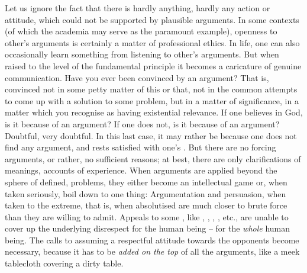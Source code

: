 Let us ignore the fact that there is hardly anything, hardly any action or
attitude, which could not be supported by plausible arguments.  In some contexts
(of which the academia may serve as the paramount example), openness to other's
arguments is certainly a matter of professional ethics.  In life, one can also
occasionally learn something from listening to other's arguments.  But when
raised to the level of the fundamental principle it becomes a caricature of
genuine communication.  Have you ever been convinced by an argument?  That is,
convinced not in some petty matter of this or that, not in the common attempts
to come up with a solution to some problem, but in a matter of significance, in
a matter which you recognise as having existential relevance.  If one believes
in God, is it because of an argument?  If one does not, is it because of an
argument? Doubtful, very doubtful. In this last case, it may rather be because
one does not find any argument, and rests satisfied with one's
.  But there are no forcing arguments, or rather, no sufficient
reasons; at best, there are only clarifications of meanings, accounts of
experience.  When arguments are applied beyond the sphere of 
defined,  problems, they either become an intellectual game or, when
taken seriously, boil down to one thing:  Argumentation and persuasion, when taken to the extreme, that is, when
{absolutised} are much closer to brute force than they are willing to
admit.  Appeals to some , like
, , , , etc., are unable to cover
up the underlying disrespect for the human being -- for the {\em whole} human
being.  The calls to assuming a respectful attitude towards the opponents
become necessary, because it has to be {\em added on the top} of all the
arguments, like a meek tablecloth covering a dirty table.

